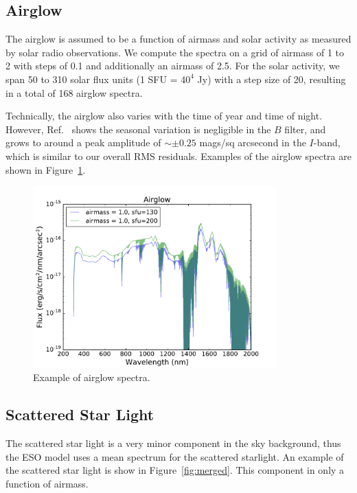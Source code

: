 \documentclass[]{spie}
\begin{document}
\subsection{Airglow}

The airglow is assumed to be a function of airmass and solar activity as measured by solar radio observations.  We compute the spectra on a grid of airmass of 1 to 2 with steps of 0.1 and additionally an airmass of 2.5.  For the solar activity, we span 50 to 310 solar flux units (1 SFU = 4$0^4$ Jy) with a step size of 20, resulting in a total of 168 airglow spectra. 

Technically, the airglow also varies with the time of year and time of night. However, Ref.~ shows the seasonal variation is negligible in the $B$ filter, and grows to around a peak amplitude of $\sim\pm0.25$ mags/sq arcsecond in the $I$-band, which is similar to our overall RMS residuals. Examples of the airglow spectra are shown in Figure~\ref{fig:airglow}. 

\begin{figure}[ht]
\begin{center}
  \includegraphics[height=7cm]{plots/airglow.pdf}
  \end{center}
  \caption{Example of airglow spectra. \label{fig:airglow}}
\end{figure}

  

\subsection{Scattered Star Light}

The scattered star light is a very minor component in the sky background, thus the ESO model uses a mean spectrum for the scattered starlight.  An example of the scattered star light is show in Figure~\ref{fig:merged}. This component in only a function of airmass.
\end{document}
